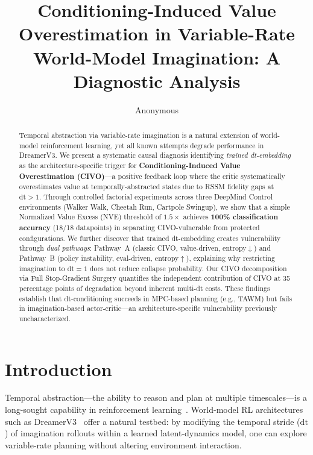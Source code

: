 \documentclass[10pt,letterpaper]{article}
\title{Conditioning-Induced Value Overestimation in Variable-Rate\\World-Model Imagination: A Diagnostic Analysis}
\author{Anonymous}
\date{}
\begin{document}
\maketitle

\begin{abstract}
Temporal abstraction via variable-rate imagination is a natural extension of world-model reinforcement learning, yet all known attempts degrade performance in DreamerV3.
We present a systematic causal diagnosis identifying \emph{trained dt-embedding} as the architecture-specific trigger for \textbf{Conditioning-Induced Value Overestimation (CIVO)}---a positive feedback loop where the critic systematically overestimates value at temporally-abstracted states due to RSSM fidelity gaps at $\mathrm{dt}>1$.
Through controlled factorial experiments across three DeepMind Control environments (Walker Walk, Cheetah Run, Cartpole Swingup), we show that a simple Normalized Value Excess (NVE) threshold of $1.5\times$ achieves \textbf{100\% classification accuracy} (18/18 datapoints) in separating CIVO-vulnerable from protected configurations.
We further discover that trained dt-embedding creates vulnerability through \emph{dual pathways}: Pathway~A (classic CIVO, value-driven, entropy$\downarrow$) and Pathway~B (policy instability, eval-driven, entropy$\uparrow$), explaining why restricting imagination to $\mathrm{dt}=1$ does not reduce collapse probability.
Our CIVO decomposition via Full Stop-Gradient Surgery quantifies the independent contribution of CIVO at 35 percentage points of degradation beyond inherent multi-dt costs.
These findings establish that dt-conditioning succeeds in MPC-based planning (e.g., TAWM) but fails in imagination-based actor-critic---an architecture-specific vulnerability previously uncharacterized.
\end{abstract}

\section{Introduction}

Temporal abstraction---the ability to reason and plan at multiple timescales---is a long-sought capability in reinforcement learning~\cite{sutton1999options,vezhnevets2017feudal}.
World-model RL architectures such as DreamerV3~\cite{hafner2023dreamerv3} offer a natural testbed: by modifying the temporal stride ($\mathrm{dt}$) of imagination rollouts within a learned latent-dynamics model, one can explore variable-rate planning without altering environment interaction.
\end{document}
